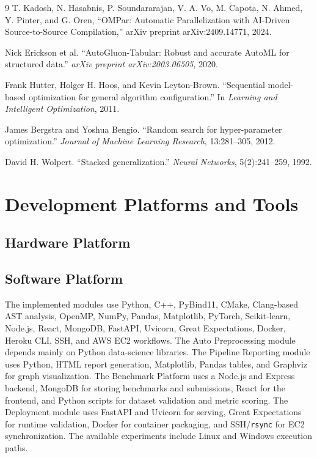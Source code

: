 \documentclass[12pt,a4paper]{report}
\begin{document}
\begin{thebibliography}{9}
T. Kadosh, N. Hasabnis, P. Soundararajan, V. A. Vo, M. Capota,
N. Ahmed, Y. Pinter, and G. Oren,
``OMPar: Automatic Parallelization with AI-Driven Source-to-Source Compilation,''
arXiv preprint arXiv:2409.14771, 2024.

Nick Erickson et al. ``AutoGluon-Tabular: Robust and accurate AutoML for
structured data.'' \emph{arXiv preprint arXiv:2003.06505}, 2020.

Frank Hutter, Holger H. Hoos, and Kevin Leyton-Brown. ``Sequential model-based
optimization for general algorithm configuration.'' In \emph{Learning and
Intelligent Optimization}, 2011.

James Bergstra and Yoshua Bengio. ``Random search for hyper-parameter
optimization.'' \emph{Journal of Machine Learning Research}, 13:281--305,
2012.

David H. Wolpert. ``Stacked generalization.'' \emph{Neural Networks},
5(2):241--259, 1992.
\end{thebibliography}

\appendix
\chapter{Development Platforms and Tools}
\section{Hardware Platform}


\section{Software Platform}
The implemented modules use Python, C++, PyBind11, CMake, Clang-based AST
analysis, OpenMP, NumPy, Pandas, Matplotlib, PyTorch, Scikit-learn, Node.js,
React, MongoDB, FastAPI, Uvicorn, Great Expectations, Docker, Heroku CLI, SSH,
and AWS EC2 workflows. The Auto Preprocessing module depends mainly on Python
data-science libraries. The Pipeline Reporting module uses Python, HTML report
generation, Matplotlib, Pandas tables, and Graphviz for graph visualization.
The Benchmark Platform uses a Node.js and Express backend, MongoDB for storing
benchmarks and submissions, React for the frontend, and Python scripts for
dataset validation and metric scoring. The Deployment module uses FastAPI and
Uvicorn for serving, Great Expectations for runtime validation, Docker for
container packaging, and SSH/\texttt{rsync} for EC2 synchronization. The
available experiments include Linux and Windows execution paths.
\end{document}

